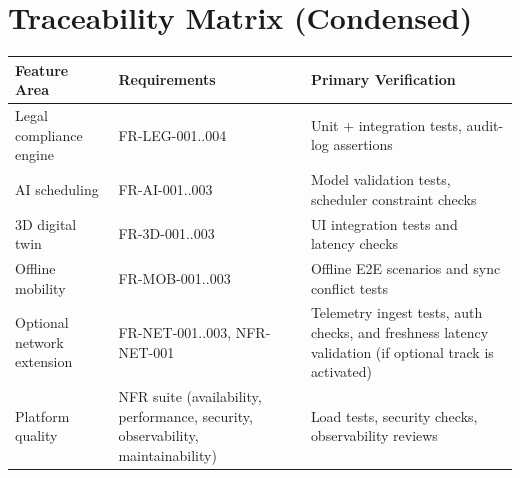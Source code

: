 \documentclass[11pt,a4paper]{article}
\newcommand{\thead}[1]{\textcolor{HeaderText}{\textbf{#1}}}
\begin{document}
\section{Traceability Matrix (Condensed)}
\begin{tabularx}{\textwidth}{P{0.22\textwidth}P{0.30\textwidth}Y}
\toprule
{}
\thead{Feature Area} & \thead{Requirements} & \thead{Primary Verification} \\
\midrule
Legal compliance engine & FR-LEG-001..004 & Unit + integration tests, audit-log assertions \\
AI scheduling & FR-AI-001..003 & Model validation tests, scheduler constraint checks \\
3D digital twin & FR-3D-001..003 & UI integration tests and latency checks \\
Offline mobility & FR-MOB-001..003 & Offline E2E scenarios and sync conflict tests \\
Optional network extension & FR-NET-001..003, NFR-NET-001 & Telemetry ingest tests, auth checks, and freshness latency validation (if optional track is activated) \\
Platform quality & NFR suite (availability, performance, security, observability, maintainability) & Load tests, security checks, observability reviews \\
\bottomrule
\end{tabularx}
\end{document}
